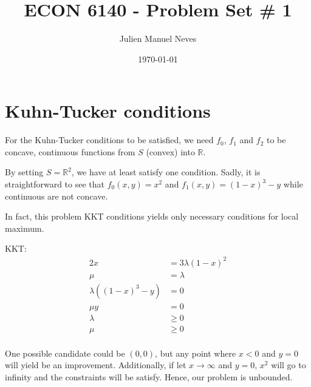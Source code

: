 \documentclass[12pt]{article}
\title{ECON 6140 - Problem Set \# 1}
\date{\today}
\author{Julien Manuel Neves}
\newcommand{\field}[1]{\mathbb{#1}}
\newcommand{\R}{\field{R}} %
\newcommand{\1}{{\bf 1}} %
\begin{document}
\maketitle

\section*{Kuhn-Tucker conditions}

For the Kuhn-Tucker conditions to be satisfied, we need $f_0$, $f_1$ and $f_2$ to be concave, continuous functions from $S$ (convex) into $\R$.

By setting $S= \R^2$, we have at least satisfy one condition. Sadly, it is straightforward to see that $f_0(x,y)=x^2$ and $f_1(x,y)=(1-x)^3-y$ while continuous are not concave. 


In fact, this problem KKT conditions yields only necessary conditions for local maximum. 

KKT:
\begin{align*}
	2x &  = 3\lambda (1-x)^2\\
	\mu & = \lambda \\
	\lambda((1-x)^3-y) &=0\\
	\mu y& =0\\
	\lambda & \geq 0 \\
	\mu & \geq 0 \\
\end{align*}

One possible candidate could be $(0,0)$, but any point where $x<0$ and $y=0$ will yield be an improvement. Additionally, if let $x\to \infty$ and $y=0$, $x^2$ will go to infinity and the constraints will be satisfy. Hence, our problem is unbounded.
\end{document}
